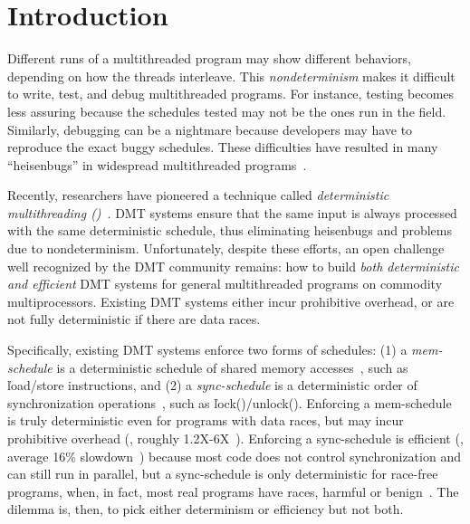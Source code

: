 \section{Introduction} \label{sec:intro}

Different runs of a multithreaded program may show different behaviors,
depending on how the threads interleave.  This \emph{nondeterminism} makes
it difficult to write, test, and debug multithreaded programs.  For
instance, testing becomes less assuring because the schedules tested may
not be the ones run in the field.  Similarly, debugging can be a nightmare
because developers may have to reproduce the exact buggy schedules.  These
difficulties have resulted in many ``heisenbugs'' in widespread
multithreaded programs~\cite{lu:concurrency-bugs}.

Recently, researchers have pioneered a technique called
\emph{deterministic multithreading
  (\dmt)}~\cite{cui:tern:osdi10,dmp:asplos09,kendo:asplos09,coredet:asplos10,dos:osdi10,grace:oopsla09}.  DMT systems ensure that the same input
is always processed with the same deterministic schedule, thus eliminating
heisenbugs and problems due to nondeterminism.  Unfortunately,
despite these efforts, an open challenge~\cite{wodet11} well recognized by
the DMT community remains: how to build \emph{both deterministic
  and efficient} DMT systems for general multithreaded programs on
commodity multiprocessors.  Existing DMT systems either incur prohibitive
overhead, or are not fully deterministic if there are data races.


Specifically, existing DMT systems enforce two forms of schedules: (1) a
\emph{mem-schedule} is a deterministic schedule of shared memory
accesses~\cite{dmp:asplos09,coredet:asplos10,dos:osdi10}, such as
\v{load/store} instructions, and (2) a \emph{sync-schedule} is a
deterministic order of synchronization
operations~\cite{kendo:asplos09,cui:tern:osdi10}, such as
\v{lock()/unlock()}.  Enforcing a mem-schedule is truly deterministic even
for programs with data races, but may incur prohibitive overhead (\eg,
roughly 1.2X-6X~\cite{coredet:asplos10}).  Enforcing a sync-schedule is
efficient (\eg, average 16\% slowdown~\cite{kendo:asplos09}) because
most code does not control synchronization and can still run in
parallel, but a sync-schedule is only deterministic for race-free
programs, when, in fact, most real programs have races, harmful or
benign~\cite{lu:concurrency-bugs,syncfinder:osdi10}.  The dilemma is,
then, to pick either determinism or efficiency but not both.

